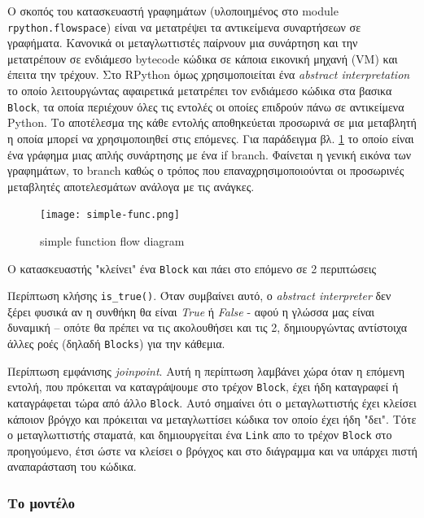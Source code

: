 Ο σκοπός του κατασκευαστή γραφημάτων (υλοποιημένος στο module
\texttt{rpython.flowspace}) είναι να μετατρέψει τα αντικείμενα συναρτήσεων σε
γραφήματα. Κανονικά οι μεταγλωττιστές παίρνουν μια συνάρτηση και την μετατρέπουν
σε ενδιάμεσο bytecode κώδικα σε κάποια εικονική μηχανή (VM) και έπειτα την
τρέχουν. Στο RPython όμως χρησιμοποιείται ένα \textit{abstract interpretation}
το οποίο λειτουργώντας αφαιρετικά μετατρέπει τον ενδιάμεσο κώδικα στα βασικα
\texttt{ Block}, τα οποία περιέχουν όλες τις εντολές οι οποίες επιδρούν πάνω σε
αντικείμενα Python. Το αποτέλεσμα της κάθε εντολής αποθηκεύεται προσωρινά σε μια
μεταβλητή η οποία μπορεί να χρησιμοποιηθεί στις επόμενες. Για παράδειγμα βλ.
\ref{figure-2} το οποίο είναι ένα γράφημα μιας απλής συνάρτησης με ένα if
branch. Φαίνεται η γενική εικόνα των γραφημάτων, το branch καθώς ο τρόπος που
επαναχρησιμοποιούνται οι προσωρινές μεταβλητές αποτελεσμάτων ανάλογα με τις
ανάγκες.

\begin{figure}[h]
\centering
\texttt{[image: simple-func.png]}
\caption{simple function flow diagram}
\label{figure-2}
\end{figure}

Ο κατασκευαστής "κλείνει" ένα \texttt{Block} και πάει στο επόμενο σε 2 
περιπτώσεις

\begin{enumeration}

\item Περίπτωση κλήσης \texttt{is\_true()}. Όταν συμβαίνει αυτό, ο \textit{
abstract interpreter} δεν ξέρει φυσικά αν η συνθήκη θα είναι \textit{True} ή
\textit{False} - αφού η γλώσσα μας είναι δυναμική – οπότε θα πρέπει να τις 
ακολουθήσει και τις 2, δημιουργώντας αντίστοιχα άλλες ροές (δηλαδή
\texttt{Blocks}) για την κάθεμια.

\item Περίπτωση εμφάνισης \textit{joinpoint}. Αυτή η περίπτωση λαμβάνει χώρα
όταν η επόμενη εντολή, που πρόκειται να καταγράψουμε στο τρέχον \texttt{Block}, 
έχει ήδη καταγραφεί ή καταγράφεται τώρα από άλλο \texttt{Block}. Αυτό σημαίνει
ότι ο μεταγλωττιστής έχει κλείσει κάποιον βρόγχο και πρόκειται να μεταγλωττίσει
κώδικα τον οποίο έχει ήδη "δει". Τότε ο μεταγλωττιστής σταματά, και 
δημιουργείται ένα \texttt{Link} απο το τρέχον \texttt{Block} στο προηγούμενο,
έτσι ώστε να κλείσει ο βρόγχος και στο διάγραμμα και να υπάρχει πιστή
αναπαράσταση του κώδικα.

\end{enumeration}

\subsubsection{Το μοντέλο}

